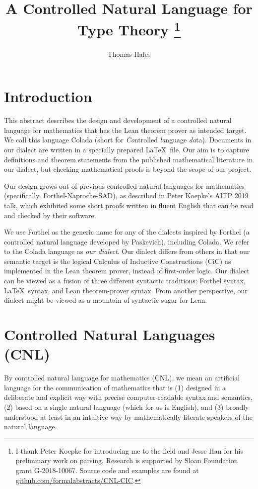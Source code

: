 \documentclass{easychair}
\title{A Controlled Natural Language for Type Theory%
\thanks{I thank Peter Koepke for introducing me to the field and Jesse Han for his
preliminary work on parsing.  
Research is supported by Sloan Foundation grant G-2018-10067.
Source code and examples are found at \url{github.com/formalabstracts/CNL-CIC}.}
}
\author{Thomas Hales}
\institute{
University of Pittsburgh\\
Pittsburgh, PA, USA
}
\renewcommand{\~}{\ }
\renewcommand{\_}{\textunderscore}
\begin{document}
\maketitle

\section{Introduction}

This abstract describes the design and development of a
controlled natural language for mathematics that has the Lean 
theorem prover as intended target.  We call this language Colada (short for
\emph{Co}ntrolled \emph{la}nguage \emph{da}ta).
Documents in our dialect are written in a specially prepared \LaTeX\ file.
Our aim is to capture definitions and theorem statements from the published
mathematical literature in our dialect, but 
checking mathematical proofs is beyond the scope of our project.



Our design grows out of previous controlled natural
languages for mathematics (specifically, Forthel-Naproche-SAD), as
described in Peter Koepke's AITP 2019 talk, which 
exhibited some short proofs written in fluent English that can be read and checked by their software. 

We use
Forthel as the generic name for any of
the dialects inspired by Forthel (a 
controlled natural language developed by Paskevich), including Colada. 
We refer to the Colada language as
\emph{our dialect}.
Our dialect differs from others in that our semantic target is the logical Calculus of Inductive
Constructions (CiC) as implemented in the Lean theorem prover, 
instead of first-order logic.  
Our dialect can be viewed as a fusion of three different syntactic traditions:
Forthel syntax, \LaTeX\ syntax, and Lean theorem-prover
syntax.  
From another perspective, our dialect might be viewed as a  
mountain of syntactic sugar for Lean.




\section{Controlled Natural Languages (CNL)}\label{sub:CNL}

By controlled natural language for mathematics (CNL), we mean an
artificial language for the communication of mathematics that is (1)
designed in a deliberate and explicit way with precise
computer-readable syntax and semantics, (2) based on a single natural
language (which for us is  English), and (3) broadly
understood at least in an intuitive way by mathematically literate
speakers of the natural language.
\end{document}
